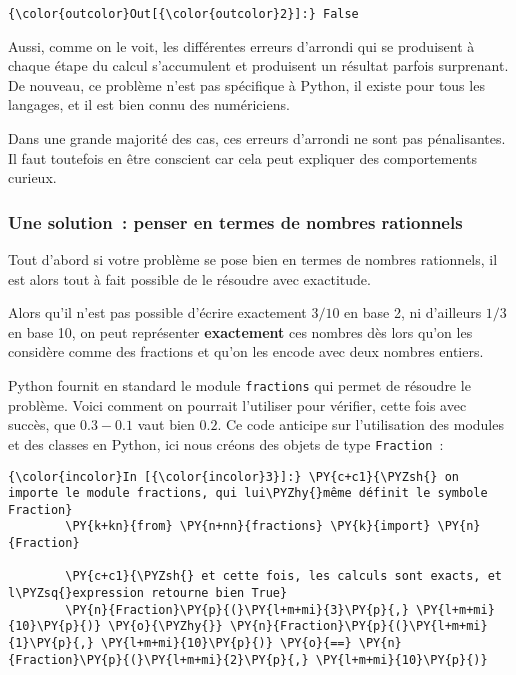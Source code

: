 \begin{Verbatim}[commandchars=\\\{\}]
{\color{outcolor}Out[{\color{outcolor}2}]:} False
\end{Verbatim}
            
    Aussi, comme on le voit, les différentes erreurs d'arrondi qui se
produisent à chaque étape du calcul s'accumulent et produisent un
résultat parfois surprenant. De nouveau, ce problème n'est pas
spécifique à Python, il existe pour tous les langages, et il est bien
connu des numériciens.

    Dans une grande majorité des cas, ces erreurs d'arrondi ne sont pas
pénalisantes. Il faut toutefois en être conscient car cela peut
expliquer des comportements curieux.

    \hypertarget{une-solution-penser-en-termes-de-nombres-rationnels}{%
\subsubsection{Une solution~: penser en termes de nombres
rationnels}\label{une-solution-penser-en-termes-de-nombres-rationnels}}

    Tout d'abord si votre problème se pose bien en termes de nombres
rationnels, il est alors tout à fait possible de le résoudre avec
exactitude.

    Alors qu'il n'est pas possible d'écrire exactement \(3/10\) en base 2,
ni d'ailleurs \(1/3\) en base 10, on peut représenter
\textbf{exactement} ces nombres dès lors qu'on les considère comme des
fractions et qu'on les encode avec deux nombres entiers.

    Python fournit en standard le module \texttt{fractions} qui permet de
résoudre le problème. Voici comment on pourrait l'utiliser pour
vérifier, cette fois avec succès, que \(0.3 - 0.1\) vaut bien \(0.2\).
Ce code anticipe sur l'utilisation des modules et des classes en Python,
ici nous créons des objets de type \texttt{Fraction}~:

    \begin{Verbatim}[commandchars=\\\{\}]
{\color{incolor}In [{\color{incolor}3}]:} \PY{c+c1}{\PYZsh{} on importe le module fractions, qui lui\PYZhy{}même définit le symbole Fraction}
        \PY{k+kn}{from} \PY{n+nn}{fractions} \PY{k}{import} \PY{n}{Fraction}
        
        \PY{c+c1}{\PYZsh{} et cette fois, les calculs sont exacts, et l\PYZsq{}expression retourne bien True}
        \PY{n}{Fraction}\PY{p}{(}\PY{l+m+mi}{3}\PY{p}{,} \PY{l+m+mi}{10}\PY{p}{)} \PY{o}{\PYZhy{}} \PY{n}{Fraction}\PY{p}{(}\PY{l+m+mi}{1}\PY{p}{,} \PY{l+m+mi}{10}\PY{p}{)} \PY{o}{==} \PY{n}{Fraction}\PY{p}{(}\PY{l+m+mi}{2}\PY{p}{,} \PY{l+m+mi}{10}\PY{p}{)}
\end{Verbatim}


